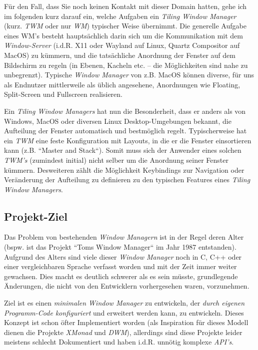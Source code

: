 \documentclass{article}
\begin{document}
Für den Fall, dass Sie noch keinen Kontakt mit dieser Domain hatten, gehe ich im folgenden kurz darauf ein,
welche Aufgaben ein \emph{Tiling Window Manager} (kurz. \emph{TWM} oder nur \emph{WM}) typischer Weise
übernimmt. Die generelle Aufgabe eines WM's besteht hauptsächlich darin sich um die Kommunikation mit dem
\emph{Window-Server} (i.d.R. X11 oder Wayland auf Linux, Quartz Compositor auf MacOS) zu kümmern, und die
tatsächliche Anordnung der Fenster auf dem Bildschirm zu regeln (in Ebenen, Kacheln etc. – die Möglichkeiten
sind nahe zu unbegrenzt). Typische \emph{Window Manager} von z.B. MacOS können diverse, für uns als Endnutzer
mittlerweile als üblich angesehene, Anordnungen wie Floating, Split-Screen und Fullscreen realisieren. \par
Ein \emph{Tiling Window Managers} hat nun die Besonderheit, dass er anders als von Windows, MacOS oder diversen
Linux Desktop-Umgebungen bekannt, die Aufteilung der Fenster automatisch und bestmöglich regelt. Typischerweise
hat ein \emph{TWM} eine feste Konfiguration mit Layouts, in die er die Fenster einsortieren kann (z.B. ``Master
and Stack``). Somit muss sich der Anwender eines solchen \emph{TWM's} (zumindest initial) nicht selber um die
Anordnung seiner Fenster kümmern. Desweiteren zählt die Möglichkeit Keybindings zur Navigation oder Veränderung
der Aufteilung zu definieren zu den typischen Features eines \emph{Tiling Window Managers}.

\subsection{Projekt-Ziel}

Das Problem von bestehenden \emph{Window Managern} ist in der Regel deren Alter (bspw. ist das Projekt ``Toms
Window Manager`` im Jahr 1987 entstanden). Aufgrund des Alters sind viele dieser \emph{Window Manager} noch in
C, C++ oder einer vergleichbaren Sprache verfasst worden und mit der Zeit immer weiter gewachsen. Dies macht es
deutlich schwerer als es sein müsste, grundlegende Änderungen, die nicht von den Entwicklern vorhergesehen waren,
vorzunehmen. \par
Ziel ist es einen \emph{minimalen Window Manager} zu entwickeln, der \emph{durch eigenen Programm-Code konfiguriert}
und erweitert werden kann, zu entwickeln. Dieses Konzept ist schon öfter Implementiert worden (als Inspiration für
dieses Modell dienen die Projekte \emph{XMonad\footnotemark} und \emph{DWM\footnotemark}), allerdings sind diese
Projekte leider meistens schlecht Dokumentiert und haben i.d.R. unnötig komplexe \emph{API's}.
\end{document}
